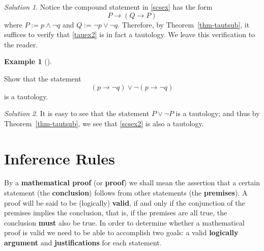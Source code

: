 \documentclass[
  letterpaper,
  10pt,
  reqno,
  twopage,
  openany]{book}
\theoremstyle{plain}
\theoremstyle{definition}
\theoremstyle{definition}
\theoremstyle{definition}
\newtheorem{example}{Example}[chapter]
\theoremstyle{plain}
\theoremstyle{plain}
\theoremstyle{remark}
\newtheorem*{solution}{Solution}
\begin{document}
\begin{solution}

Notice the compound statement in \eqref{scsex} has the form
\begin{equation}
\label{tauex2}
P\rightarrow (Q\rightarrow P)
\end{equation} where \(P:=p\land \neg q\) and \(Q:=\neg p\lor \neg q\).
Therefore, by Theorem~\ref{thm-tautsub}, it suffices to verify that
\eqref{tauex2} is in fact a tautology. We leave this verification to the
reader.

\end{solution}

\leavevmode{}%
\begin{example}[]\label{exm-tautology-3}

Show that the statement \begin{equation}
\label{scsex2}
(p\rightarrow \neg q)\lor \neg (p\rightarrow \neg q)
\end{equation} is a tautology.

\end{example}

\begin{solution}

It is easy to see that the statement \(P\lor \neg P\) is a tautology;
and thus by Theorem~\ref{thm-tautsub}, we see that \eqref{scsex2} is
also a tautology.

\end{solution}

\hypertarget{inference-rules}{%
\section{Inference Rules}\label{inference-rules}}

By a  \textbf{mathematical proof} (or
 \textbf{proof}) we shall mean the assertion that a certain
statement (the  \textbf{conclusion}) follows from
other statements (the  \textbf{premises}). A proof will
be said to be (logically)  \textbf{valid}, if and only if
the conjunction of the premises implies the conclusion, that is, if the
premises are all true, the conclusion  \textbf{must} also be
true. In order to determine whether a mathematical proof is valid we
need to be able to accomplish two goals: a valid
 \textbf{logically argument} and
 \textbf{justifications} for each statement.
\end{document}
